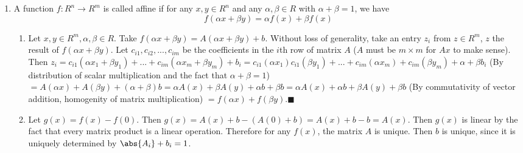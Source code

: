 \documentclass{article}
\begin{document}
\begin{enumerate}
	\item A function $f: R^n \rightarrow R^m$ is called affine if for any $x, y \in R^n$ and any $\alpha, \beta \in R$ with $\alpha + \beta = 1$, we have
$$
f(\alpha x + \beta y) = \alpha f(x) + \beta f(x)
$$
	\begin{enumerate}
		\item Let $x,y \in R^m, \alpha, \beta \in R$. Take $f(\alpha x + \beta y) = A(\alpha x + \beta y) + b$. Without loss of generality, take an entry $z_{i}$ from $z \in R^m$, $z$ the result of $f(\alpha x + \beta y)$. Let $c_{i1}, c_{i2},...,c_{im}$ be the coefficients in the $i$th row of matrix $A$ ($A$ must be $m \times m$ for $Ax$ to make sense). Then $z_{i}= c_{i1}(\alpha x_{1} + \beta y_{1}) + ... +c_{im}(\alpha x_{m} + \beta y_{m}) + b_{i} = c_{i1}(\alpha x_{1})  c_{i1}(\beta y_{1}) + ... +c_{im}(\alpha x_{m}) + c_{im}(\beta y_{m}) + {\alpha + \beta} b_{i}$ (By distribution of scalar multiplication and the fact that $\alpha + \beta = 1$) $= A(\alpha x) + A(\beta y ) + (\alpha + \beta)b = \alpha A(x) + \beta A(y) + \alpha b + \beta b = \alpha A(x) + \alpha b + \beta A(y) + \beta b$ (By commutativity of vector addition, homogenity of matrix multiplication) $ = f(\alpha x) + f(\beta y). \blacksquare$
		\item Let $g(x) = f(x) - f(0)$. Then $g(x) = A(x) + b - (A(0) + b) = A(x) + b - b = A(x)$. Then $g(x)$ is linear by the fact that every matrix product is a linear operation. Therefore for any $f(x)$, the matrix $A$ is unique. Then $b$ is unique, since it is uniquely determined by $\abs{A_{i}} +  b_{i} = 1$.
	\end{enumerate}
\end{enumerate}
\end{document}
